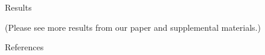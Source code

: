 \documentclass[final]{beamer}
\newlength{\twocolwid}
\begin{document}
\begin{frame}[t]
\begin{columns}[t]
\begin{column}{\twocolwid}
\begin{block}{Results}
			
			\small{(Please see more results from our paper and supplemental materials.)}	
			
        \end{block}

        \begin{block}{References}
            \vspace{-1cm}
            \nocite{*} %
            
            
        \end{block}
    \end{column} %
    
\end{columns} %


\end{frame} %
\end{document}
